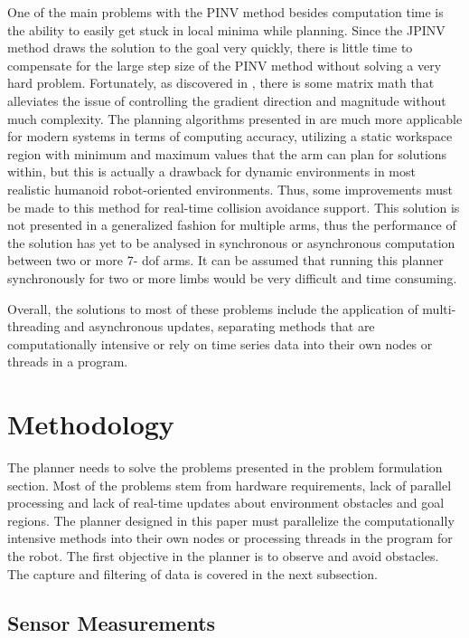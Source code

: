 \documentclass[conference]{IEEEtran} \usepackage[T1]{fontenc} \usepackage[backend=biber, style=ieee]{biblatex}
\begin{document}
One of the main problems with the PINV method besides computation time is the ability to easily get stuck in local minima while planning. Since the JPINV method draws
the solution to the goal very quickly, there is little time to compensate for the large step size of the PINV method without solving a very hard problem. Fortunately,
as discovered in \cite{wgr_planning}, there is some matrix math that alleviates the issue of controlling the gradient direction and magnitude without much complexity. 
The planning algorithms presented in \cite{wgr_planning} are much more applicable for modern systems in terms of computing accuracy, utilizing a static workspace 
region with minimum and maximum values that the arm can plan for solutions within, but this is actually a drawback for dynamic environments in most realistic humanoid 
robot-oriented environments. Thus, some improvements must be made to this method for real-time collision avoidance support. This solution is not presented in a 
generalized fashion for multiple arms, thus the performance of the solution has yet to be analysed in synchronous or asynchronous computation between two or more 7-
dof arms. It can be assumed that running this planner synchronously for two or more limbs would be very difficult and time consuming. 

Overall, the solutions to most of these problems include the application of multi-threading and asynchronous updates, separating methods that are computationally 
intensive or rely on time series data into their own nodes or threads in a program.

\section{Methodology} \label{Methodology}

The planner needs to solve the problems presented in the problem formulation section. Most of the problems stem from hardware requirements, lack of parallel processing and 
lack of real-time updates about environment obstacles and goal regions. The planner designed in this paper must parallelize the computationally intensive methods into 
their own nodes or processing threads in the program for the robot. The first objective in the planner is to observe and avoid obstacles. The capture and filtering of data is covered in the next subsection.

\subsection{Sensor Measurements} \label{Sensor Measurements}
\end{document}
